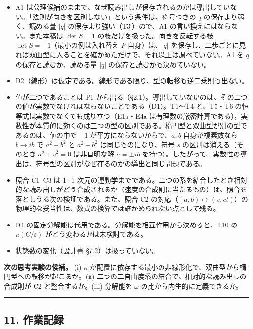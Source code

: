 \documentclass[
  a4paper,
]{ltjsarticle}
\providecommand{\tightlist}{%
  \setlength{\itemsep}{0pt}\setlength{\parskip}{0pt}}
\begin{document}
\begin{itemize}
\tightlist
\item
  A1
  は公理候補のままで、なぜ読み出しが保存されるのかは導出していない。「法則が向きを区別しない」という条件は、符号つきの
  \(q\) の保存より弱く、読める量 \(\lvert q\rvert\)
  の保存より強い（T3′）ので、A1 の言い換えにはならない。また本稿は
  \(\det S=1\) の枝だけを扱った。向きを反転する枝
  \(\det S=-1\)（最小の例は入れ替え \(P\) 自身）は、\(\lvert q\rvert\)
  を保存し、二歩ごとに見れば双曲型に入ることを確かめただけで、それ以上は調べていない。A1
  を \(q\) の保存と読むか、読める量 \(\lvert q\rvert\)
  の保存と読むかも決めていない。
\item
  D2（線形）は仮定である。線形である限り、型の転移も逆二乗則も出ない。
\item
  値が二つであることは P1
  から出る（§2.1）。導出していないのは、その二つの値が実数でなければならないことである（D1）。T1〜T4
  と、T5・T6 の恒等式は実数でなくても成り立つ（E1a・E4a
  は有理数の厳密計算である）。実数性が本質的に効くのは三つの型の区別である。楕円型と双曲型が別の型であるのは、値の中で
  \(-1\) が平方にならないからで、\(a,b\) 自身が複素数なら \(b\to ib\) で
  \(a^2+b^2\) と \(a^2-b^2\) は同じものになり、符号 \(s\)
  の区別は消える（そのとき \(a^2+b^2=0\) は非自明な解 \(a=\pm ib\)
  を持つ）。したがって、実数性の導出は、符号型の区別がなぜ在るのかの導出と同じ問題である。
\item
  照合 C1--C3 は 1+1
  次元の運動学までである。二つの系を結合したとき相対的な読み出しがどう合成されるか（速度の合成則に当たるもの）は、照合を落としうる次の検証である。また、照合
  C2
  の対応（\((a,b)\leftrightarrow(x,ct)\)）の物理的な妥当性は、数式の検算では確かめられない点として残る。
\item
  D4 の固定分解能は代用である。分解能を相互作用から決めると、T10 の
  \(n(C/\varepsilon)\) がどう変わるかは未検討である。
\item
  状態数の変化（設計書 §7.2）は扱っていない。
\end{itemize}

\textbf{次の思考実験の候補。} (i) \(\kappa\)
が配置に依存する最小の非線形化で、双曲型から楕円型への転移が起こるか。(ii)
二つの二自由度系の結合で、相対的な読み出しの合成則が C2
と整合するか。(iii) 分解能を \(\omega\) の比から内生的に定義できるか。

\begin{center}\rule{0.5\linewidth}{0.5pt}\end{center}

\subsection{11. 作業記録}\label{ux4f5cux696dux8a18ux9332}
\end{document}
